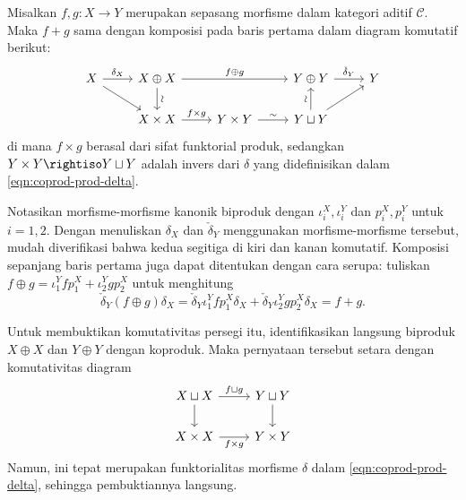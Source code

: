 \begin{proposisi}\label{prop:additive-cat-addition}
	Misalkan $f,g: X \to Y$ merupakan sepasang morfisme dalam kategori aditif
	$\mathcal{C}$. Maka $f+g$ sama dengan komposisi pada baris pertama
	dalam diagram komutatif berikut:
	\[\begin{tikzcd}
		X \arrow[r, "\delta_X"] \arrow[rd] & X \oplus X \arrow[rr, "f \oplus g"] \arrow[d, "\sim" sloped] & & Y \oplus Y \arrow[r, "\check{\delta}_Y"] & Y \\
		& X \times X \arrow[r, "f \times g"] & Y \times Y \arrow[r, "\sim"] & Y \sqcup Y \arrow[ru] \arrow[u, "\sim" sloped] &
	\end{tikzcd}\]
	di mana $f \times g$ berasal dari sifat funktorial produk, sedangkan
	$Y \times Y \rightiso Y \sqcup Y$ adalah invers dari $\delta$ yang
	didefinisikan dalam \eqref{eqn:coprod-prod-delta}.
\end{proposisi}

\begin{bukti}
	Notasikan morfisme-morfisme kanonik biproduk dengan
	$\iota_i^X, \iota_i^Y$ dan $p_i^X,p_i^Y$ untuk $i=1,2$. Dengan menuliskan
	$\delta_X$ dan $\check{\delta}_Y$ menggunakan morfisme-morfisme tersebut,
	mudah diverifikasi bahwa kedua segitiga di kiri dan kanan komutatif.
	Komposisi sepanjang baris pertama juga dapat ditentukan dengan cara serupa:
	tuliskan
	$f \oplus g = \iota_1^Y f p^X_1 + \iota_2^Y g p^X_2$ untuk menghitung
	\begin{equation}
		\check{\delta}_Y (f \oplus g) \delta_X = \check{\delta}_Y \iota_1^Y f p^X_1 \delta_X + \check{\delta}_Y \iota_2^Y g p^X_2 \delta_X
		= f + g.
	\end{equation}

	Untuk membuktikan komutativitas persegi itu, identifikasikan langsung biproduk
	$X \oplus X$ dan $Y \oplus Y$ dengan koproduk. Maka pernyataan tersebut
	setara dengan komutativitas diagram
	\[\begin{tikzcd}
		X \sqcup X \arrow[r, "{f \sqcup g}"] \arrow[d] & Y \sqcup Y \arrow[d] \\
		X \times X \arrow[r, "{f \times g}"'] & Y \times Y
	\end{tikzcd}\]
	Namun, ini tepat merupakan funktorialitas morfisme $\delta$ dalam
	\eqref{eqn:coprod-prod-delta}, sehingga pembuktiannya langsung.
\end{bukti}

